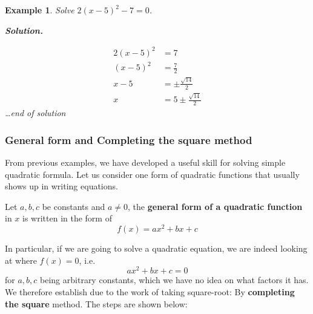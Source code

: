 \documentclass[12pt]{article}
\newtheorem*{example}{Example}
\newenvironment{solution}{\begin{snugshade*} \textbf{Solution.} \par}{\hfill \textit{\dots end of solution} \end{snugshade*}}
\begin{document}
    \begin{example}
        Solve $2(x-5)^2-7=0$.

        \begin{solution}
            \begin{align*}
                2(x-5)^2&=7\\
                (x-5)^2&=\frac{7}{2}\\
                x-5&=\pm\frac{\sqrt{14}}{2}\\
                x&=5\pm\frac{\sqrt{14}}{2}
            \end{align*}
        \end{solution}
    \end{example}

    \subsubsection*{General form and Completing the square method}

    From previous examples, we have developed a useful skill for solving simple quadratic formula. Let us consider one form of quadratic functions that usually shows up in writing equations.

    Let $a,b,c$ be constants and $a\neq 0$, the \textbf{general form of a quadratic function} in $x$ is written in the form of $$f(x)=ax^2+bx+c$$

    In particular, if we are going to solve a quadratic equation, we are indeed looking at where $f(x)=0$, i.e. $$ax^2+bx+c=0$$
    for $a,b,c$ being arbitrary constants, which we have no idea on what factors it has. We therefore establish due to the work of taking square-root: By \textbf{completing the square} method. The steps are shown below:
\end{document}
